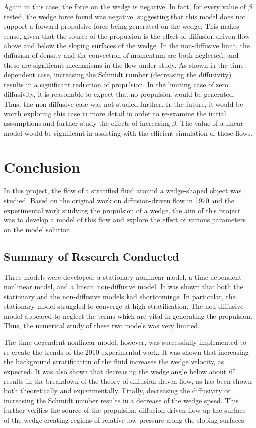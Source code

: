 \documentclass[12pt]{article}
\begin{document}
Again in this case, the force on the wedge is negative. In fact, for every value of $\beta$ tested, the wedge force found was negative, suggesting that this model does not support a forward propulsive force being generated on the wedge. This makes sense, given that the source of the propulsion is the effect of diffusion-driven flow above and below the sloping surfaces of the wedge. In the non-diffusive limit, the diffusion of density and the convection of momentum are both neglected, and these are significant mechanisms in the flow under study. As shown in the time-dependent case, increasing the Schmidt number (decreasing the diffusivity) results in a significant reduction of propulsion. In the limiting case of zero diffusivity, it is reasonable to expect that no propulsion would be generated. Thus, the non-diffusive case was not studied further. In the future, it would be worth exploring this case in more detail in order to re-examine the initial assumptions and further study the effects of increasing $\beta$. The value of a linear model would be significant in assisting with the efficient simulation of these flows.

\section{Conclusion}

In this project, the flow of a stratified fluid around a wedge-shaped object was studied. Based on the original work on diffusion-driven flow in 1970 and the experimental work studying the propulsion of a wedge, the aim of this project was to develop a model of this flow and explore the effect of various parameters on the model solution.

\subsection{Summary of Research Conducted}

Three models were developed: a stationary nonlinear model, a time-dependent nonlinear model, and a linear, non-diffusive model. It was shown that both the stationary and the non-diffusive models had shortcomings. In particular, the stationary model struggled to converge at high stratification. The non-diffusive model appeared to neglect the terms which are vital in generating the propulsion. Thus, the numerical study of these two models was very limited.

The time-dependent nonlinear model, however, was successfully implemented to re-create the trends of the 2010 experimental work. It was shown that increasing the background stratification of the fluid increases the wedge velocity, as expected. It was also shown that decreasing the wedge angle below about $6\degree$ results in the breakdown of the theory of diffusion driven flow, as has been shown both theoretically and experimentally. Finally, decreasing the diffusivity or increasing the Schmidt number results in a decrease of the wedge speed. This further verifies the source of the propulsion: diffusion-driven flow up the surface of the wedge creating regions of relative low pressure along the sloping surfaces.
\end{document}
